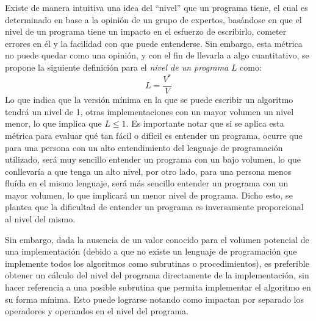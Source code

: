 \documentclass[letterpaper,12pt]{article}
\begin{document}
Existe de manera intuitiva una idea del ``nivel'' que un programa tiene, el cual es determinado en base a la opinión de un grupo de expertos, basándose en que el nivel de un programa tiene un impacto en el esfuerzo de escribirlo, cometer errores en él y la facilidad con que puede entenderse. Sin embargo, esta métrica no puede quedar como una opinión, y con el fin de llevarla a algo cuantitativo, se propone la siguiente definición para el \textit{nivel de un programa} $L$ como:
\begin{equation}
  \label{eqn:programLevel}
  L = \frac{V^{*}}{V}
\end{equation}
Lo que indica que la versión mínima en la que se puede escribir un algoritmo tendrá un nivel de 1, otras implementaciones con un mayor volumen un nivel menor, lo que implica que $L \leq 1$. Es importante notar que si se aplica esta métrica para evaluar qué tan fácil o difícil es entender un programa, ocurre que para una persona con un alto entendimiento del lenguaje de programación utilizado, será muy sencillo entender un programa con un bajo volumen, lo que conllevaría a que tenga un alto nivel, por otro lado, para una persona menos fluída en el mismo lenguaje, será más sencillo entender un programa con un mayor volumen, lo que implicará un menor nivel de programa. Dicho esto, se plantea que la dificultad de entender un programa es inversamente proporcional al nivel del mismo.

Sin embargo, dada la ausencia de un valor conocido para el volumen potencial de una implementación (debido a que no existe un lenguaje de programación que implemente todos los algoritmos como subrutinas o procedimientos), es preferible obtener un cálculo del nivel del programa directamente de la implementación, sin hacer referencia a una posible subrutina que permita implementar el algoritmo en su forma mínima. Esto puede lograrse notando como impactan por separado los operadores y operandos en el nivel del programa.
\end{document}
